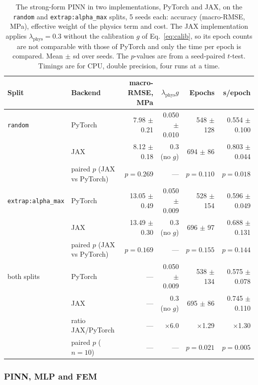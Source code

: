 \documentclass[pdflatex,sn-basic,Numbered]{sn-jnl}
\begin{document}
\begin{table}
\centering
\caption[The strong-form PINN in PyTorch and in JAX]{The strong-form PINN in two implementations, PyTorch and JAX, on the \texttt{random} and \texttt{extrap:alpha\_max} splits, 5 seeds each: accuracy (macro-RMSE, MPa), effective weight of the physics term and cost. The JAX implementation applies $\lambda_{\mathrm{phys}}=0.3$ without the calibration $g$ of Eq.~\eqref{eq:calib}, so its epoch counts are not comparable with those of PyTorch and only the time per epoch is compared. Mean $\pm$ sd over seeds. The $p$-values are from a seed-paired $t$-test. Timings are for CPU, double precision, four runs at a time.}
\label{tab:backend}

\begin{tabular}{@{}llrrrr@{}}
\toprule
Split & Backend & macro-RMSE, MPa & $\lambda_{\mathrm{phys}}g$ & Epochs & s/epoch \\
\midrule
\texttt{random} & PyTorch & 7.98 $\pm$ 0.21 & 0.050 $\pm$ 0.010 & 548 $\pm$ 128 & 0.554 $\pm$ 0.100 \\
 & JAX & 8.12 $\pm$ 0.18 & 0.3 (no $g$) & 694 $\pm$ 86 & 0.803 $\pm$ 0.044 \\
 & paired $p$ (JAX vs PyTorch) & $p = 0.269$ & --- & $p = 0.110$ & $p = 0.018$ \\
\addlinespace
\texttt{extrap:alpha\_max} & PyTorch & 13.05 $\pm$ 0.49 & 0.050 $\pm$ 0.009 & 528 $\pm$ 154 & 0.596 $\pm$ 0.049 \\
 & JAX & 13.49 $\pm$ 0.30 & 0.3 (no $g$) & 696 $\pm$ 97 & 0.688 $\pm$ 0.131 \\
 & paired $p$ (JAX vs PyTorch) & $p = 0.169$ & --- & $p = 0.155$ & $p = 0.144$ \\
\midrule
both splits & PyTorch & --- & 0.050 $\pm$ 0.009 & 538 $\pm$ 134 & 0.575 $\pm$ 0.078 \\
 & JAX & --- & 0.3 (no $g$) & 695 $\pm$ 86 & 0.745 $\pm$ 0.110 \\
 & ratio JAX/PyTorch & --- & $\times$6.0 & $\times$1.29 & $\times$1.30 \\
 & paired $p$ ($n = 10$) & --- & --- & $p = 0.021$ & $p = 0.005$ \\
\bottomrule
\end{tabular}
\end{table}

\subsubsection{PINN, MLP and FEM}
\label{sec:res_fem}
\end{document}
